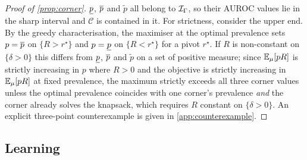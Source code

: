 \begin{proof}[Proof of \cref{prop:corner}]
$\underline{p}$, $\overline{p}$ and $\tilde p$ all belong to $\mathcal{I}_\Gamma$, so their AUROC values
lie in the sharp interval and $\mathcal{C}$ is contained in it. For strictness,
consider the upper end. By the greedy characterisation, the maximiser at the
optimal prevalence sets $p=\overline{p}$ on $\{R > r^\star\}$ and $p=\underline{p}$ on
$\{R<r^\star\}$ for a pivot $r^\star$. If $R$ is non-constant on
$\{\delta>0\}$ this differs from $\underline{p}$, $\overline{p}$ and $\tilde p$ on a set of
positive measure; since $\mathbb{E}_\mu[pR]$ is strictly increasing in $p$ where $R>0$
and the objective is strictly increasing in $\mathbb{E}_\mu[pR]$ at fixed prevalence,
the maximum strictly exceeds all three corner values unless the optimal
prevalence coincides with one corner's prevalence \emph{and} the corner already
solves the knapsack, which requires $R$ constant on $\{\delta>0\}$. An explicit
three-point counterexample is given in \cref{app:counterexample}.
\end{proof}

\subsection{Learning}
\label{app:learning}

